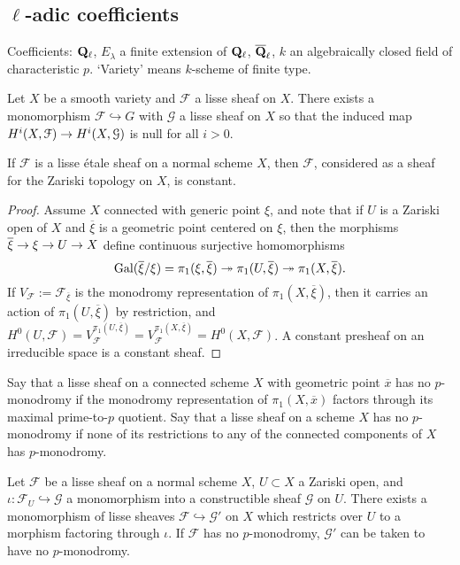 \documentclass[deligne.tex]{subfiles}
\begin{document}
\subsection{$\ell$-adic coefficients}
Coefficients: $\mathbf{Q}_\ell$, $E_\lambda$ a finite extension of $\mathbf{Q}_\ell$,
$\overline{\mathbf{Q}}_\ell$, $k$ an algebraically closed field of characteristic 
$p$. `Variety' means $k$-scheme of finite type.
\begin{proposition}\label{prop:efface_lisse}
	Let $X$ be a smooth variety and $\mathcal F$ a
	lisse sheaf on $X$. There exists a monomorphism
	$\mathcal F\hookrightarrow G$ with $\mathcal G$ a lisse sheaf on $X$
	so that the induced map $H^i(X,\mathcal F)\rightarrow H^i(X,\mathcal G)$ is null
	for all $i>0$.
\end{proposition}
\begin{lemma}\label{lem:constant_presheaf}
	If $\mathcal F$ is a lisse étale sheaf on a normal scheme $X$, then 
	$\mathcal F$, considered as a sheaf for the Zariski topology on $X$,
	is constant.
\end{lemma}
\begin{proof}
Assume $X$ connected with generic point $\xi$, and note that if $U$ is a
Zariski open of $X$ and $\overline\xi$ is a geometric point centered on
$\xi$, then the morphisms $\overline\xi\rightarrow\xi\rightarrow U\rightarrow X$ define continuous surjective homomorphisms
\begin{equation*}
	\operatorname{Gal}(\overline\xi/\xi)=\pi_1(\xi,\overline\xi)\twoheadrightarrow
	\pi_1(U,\overline\xi)\twoheadrightarrow\pi_1(X,\overline\xi).
\end{equation*}
If $V_\mathcal F:=\mathcal F_{\overline\xi}$ is the monodromy 
representation of $\pi_1(X,\overline\xi)$, then it carries an action of
$\pi_1(U,\overline\xi)$ by restriction, and
$H^0(U,\mathcal F)=V_\mathcal F^{\pi_1(U,\overline\xi)}=V_\mathcal F^{\pi_1(X,\overline\xi)}=H^0(X,\mathcal F)$.
A constant presheaf on an irreducible space is a constant sheaf.
\end{proof}
	Say that a lisse sheaf on a connected scheme $X$ with geometric point 
$\overline x$ has no $p$-monodromy if the monodromy representation of
$\pi_1(X,\overline x)$ factors through its maximal prime-to-$p$ quotient.
Say that a lisse sheaf on a scheme $X$ has no $p$-monodromy if none of its
restrictions to any of the connected components of $X$ has $p$-monodromy.
\begin{lemma}\label{lem:extend_mono}
	Let $\mathcal F$ be a lisse sheaf on a normal scheme $X$, $U\subset X$ a
	Zariski open, and $\iota:\mathcal F_U\hookrightarrow \mathcal G$ a 
	monomorphism into a constructible sheaf $\mathcal G$ on $U$. There exists 
	a monomorphism of lisse sheaves $\mathcal F\hookrightarrow\mathcal G'$ on
	$X$ which restricts over $U$ to a morphism factoring through $\iota$.
	If $\mathcal F$ has no $p$-monodromy, $\mathcal G'$ can be taken to have
	no $p$-monodromy.
\end{lemma}
\end{document}
